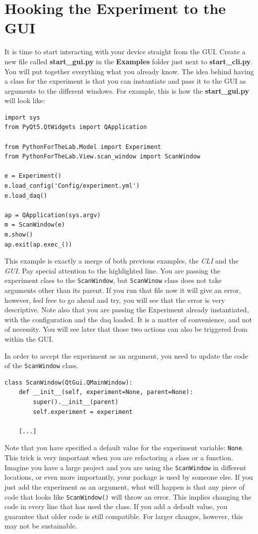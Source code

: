 \section{Hooking the Experiment to the GUI}\label{hooking-the-experiment-to-the-gui}
It is time to start interacting with your device straight from the
{GUI}. Create a new file called \textbf{start\_gui.py} in the
\textbf{Examples} folder just next to \textbf{start\_cli.py}. You will
put together everything what you already know. The idea behind having a
class for the experiment is that you can instantiate and pass it to the
{GUI} as arguments to the different windows. For example, this is how
the \textbf{start\_gui.py} will look like:

\begin{verbatim}
import sys
from PyQt5.QtWidgets import QApplication

from PythonForTheLab.Model import Experiment
from PythonForTheLab.View.scan_window import ScanWindow

e = Experiment()
e.load_config('Config/experiment.yml')
e.load_daq()

ap = QApplication(sys.argv)
m = ScanWindow(e)
m.show()
ap.exit(ap.exec_())
\end{verbatim}

This example is exactly a merge of both previous examples, the
\emph{CLI} and the \emph{GUI}. Pay special attention to the
highlighted line. You are passing the experiment class to the
\texttt{ScanWindow}, but \texttt{ScanWinow} class does not take
arguments other than its parent. If you run that file now it will give
an error, however, feel free to go ahead and try, you will see that the
error is very descriptive. Note also that you are passing the Experiment
already instantiated, with the configuration and the daq loaded. It is a
matter of convenience, and not of necessity. You will see later that
those two actions can also be triggered from within the {GUI}.

In order to accept the experiment as an argument, you need to update the
code of the \texttt{ScanWindow} class.

\begin{verbatim}
class ScanWindow(QtGui.QMainWindow):
    def __init__(self, experiment=None, parent=None):
        super().__init__(parent)
        self.experiment = experiment
    
    [...]
\end{verbatim}

Note that you have specified a default value for the experiment
variable: \texttt{None}. This trick is very important when you are
refactoring a class or a function. Imagine you have a large project and
you are using the \texttt{ScanWindow} in different locations, or even
more importantly, your package is used by someone else. If you just add
the experiment as an argument, what will happen is that any piece of
code that looks like \texttt{ScanWindow()} will throw an error. This
implies changing the code in every line that has used the class. If you
add a default value, you guarantee that older code is still compatible.
For larger changes, however, this may not be sustainable.

